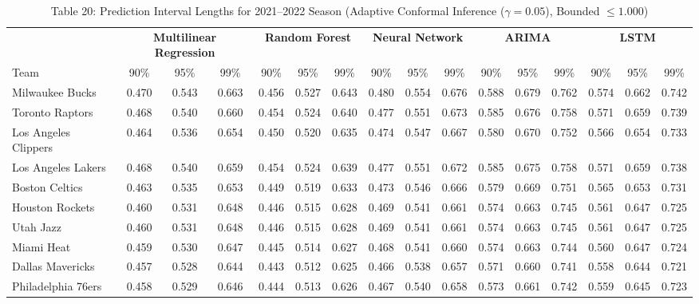 \documentclass[11pt,a4paper]{article}
\begin{document}
\begin{table}[H]
\centering
\caption{Table 20: Prediction Interval Lengths for 2021--2022 Season (Adaptive Conformal Inference ($\gamma=0.05$), Bounded $\le 1.000$)}
\label{tab:team_table20}
\tiny
\setlength{\tabcolsep}{1.5pt}
\begin{tabular}{l ccc ccc ccc ccc ccc}
\toprule
 & \multicolumn{3}{c}{\textbf{Multilinear Regression}} & \multicolumn{3}{c}{\textbf{Random Forest}} & \multicolumn{3}{c}{\textbf{Neural Network}} & \multicolumn{3}{c}{\textbf{ARIMA}} & \multicolumn{3}{c}{\textbf{LSTM}} \\
\cmidrule(lr){2-4} \cmidrule(lr){5-7} \cmidrule(lr){8-10} \cmidrule(lr){11-13} \cmidrule(lr){14-16}
Team & 90\% & 95\% & 99\% & 90\% & 95\% & 99\% & 90\% & 95\% & 99\% & 90\% & 95\% & 99\% & 90\% & 95\% & 99\% \\
\midrule
Milwaukee Bucks & 0.470 & 0.543 & 0.663 & 0.456 & 0.527 & 0.643 & 0.480 & 0.554 & 0.676 & 0.588 & 0.679 & 0.762 & 0.574 & 0.662 & 0.742 \\
Toronto Raptors & 0.468 & 0.540 & 0.660 & 0.454 & 0.524 & 0.640 & 0.477 & 0.551 & 0.673 & 0.585 & 0.676 & 0.758 & 0.571 & 0.659 & 0.739 \\
Los Angeles Clippers & 0.464 & 0.536 & 0.654 & 0.450 & 0.520 & 0.635 & 0.474 & 0.547 & 0.667 & 0.580 & 0.670 & 0.752 & 0.566 & 0.654 & 0.733 \\
Los Angeles Lakers & 0.468 & 0.540 & 0.659 & 0.454 & 0.524 & 0.639 & 0.477 & 0.551 & 0.672 & 0.585 & 0.675 & 0.758 & 0.571 & 0.659 & 0.738 \\
Boston Celtics & 0.463 & 0.535 & 0.653 & 0.449 & 0.519 & 0.633 & 0.473 & 0.546 & 0.666 & 0.579 & 0.669 & 0.751 & 0.565 & 0.653 & 0.731 \\
Houston Rockets & 0.460 & 0.531 & 0.648 & 0.446 & 0.515 & 0.628 & 0.469 & 0.541 & 0.661 & 0.574 & 0.663 & 0.745 & 0.561 & 0.647 & 0.725 \\
Utah Jazz & 0.460 & 0.531 & 0.648 & 0.446 & 0.515 & 0.628 & 0.469 & 0.541 & 0.661 & 0.574 & 0.663 & 0.745 & 0.561 & 0.647 & 0.725 \\
Miami Heat & 0.459 & 0.530 & 0.647 & 0.445 & 0.514 & 0.627 & 0.468 & 0.541 & 0.660 & 0.574 & 0.663 & 0.744 & 0.560 & 0.647 & 0.724 \\
Dallas Mavericks & 0.457 & 0.528 & 0.644 & 0.443 & 0.512 & 0.625 & 0.466 & 0.538 & 0.657 & 0.571 & 0.660 & 0.741 & 0.558 & 0.644 & 0.721 \\
Philadelphia 76ers & 0.458 & 0.529 & 0.646 & 0.444 & 0.513 & 0.626 & 0.467 & 0.540 & 0.658 & 0.573 & 0.661 & 0.742 & 0.559 & 0.645 & 0.723 \\

\end{tabular}
\end{table}
\end{document}
